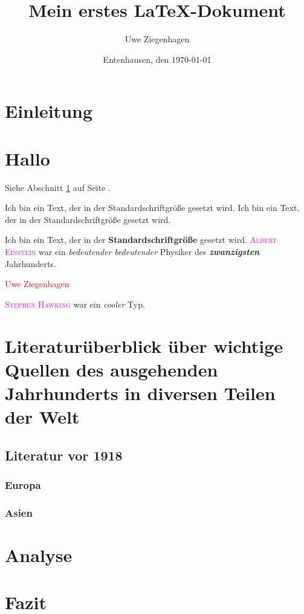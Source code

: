 \documentclass[12pt,ngerman, parskip=half]{scrartcl}
\author{Uwe Ziegenhagen}
\title{Mein erstes LaTeX-Dokument}
\date{Entenhausen, den \today}
\newcommand{\person}[1]{\textcolor{magenta}{\textsc{#1}}}
\begin{document}
\maketitle

\tableofcontents

\section{Einleitung}\label{sec:einleitung}


\section*{Hallo} %

\blindtext

Siehe Abschnitt \ref{sec:einleitung} auf Seite \pageref{sec:einleitung}.

Ich bin ein Text, der in der Standardschriftgröße gesetzt wird. Ich bin ein Text, der in der Standardschriftgröße gesetzt wird.

Ich bin ein Text, der in der \textbf{Standardschriftgröße} gesetzt wird. \person{Albert Einstein} war ein \textit{bedeutender} \textsl{bedeutender}  Physiker des \textit{\textbf{zwanzigsten}} Jahrhunderts.

\textcolor{red}{Uwe Ziegenhagen}

\person{Stephen Hawking}  war ein \emph{cooler} Typ.

\section[Literatur]{Literaturüberblick über wichtige Quellen des ausgehenden Jahrhunderts in diversen Teilen der Welt}


\subsection{Literatur vor 1918}
\subsubsection{Europa}

\blindtext[2]

\subsubsection{Asien}

\blindtext[2]


\section{Analyse}

\blindtext[2]

\section{Fazit}

\blindtext[2]
\end{document}
